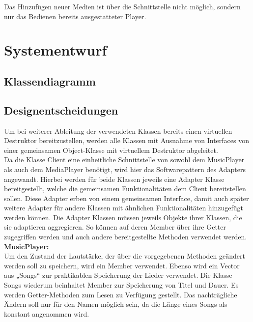 Das Hinzufügen neuer Medien ist über die Schnittstelle nicht möglich, sondern nur das Bedienen bereits ausgestatteter Player.\\


\section{Systementwurf}

\subsection{Klassendiagramm}

\subsection{Designentscheidungen}
Um bei weiterer Ableitung der verwendeten Klassen bereits einen virtuellen Destruktor bereitzustellen, werden alle Klassen mit Ausnahme von Interfaces von einer gemeinsamen Object-Klasse mit virtuellem Destruktor abgeleitet.\\

Da die Klasse Client eine einheitliche Schnittstelle von sowohl dem MusicPlayer als auch dem MediaPlayer benötigt, wird hier das Softwarepattern des Adapters angewandt. Hierbei werden für beide Klassen jeweils eine Adapter Klasse bereitgestellt, welche die gemeinsamen Funktionalitäten dem Client bereitstellen sollen. Diese Adapter erben von einem gemeinsamen Interface, damit auch später weitere Adapter für andere Klassen mit ähnlichen Funktionalitäten hinzugefügt werden können.
Die Adapter Klassen müssen jeweils Objekte ihrer Klassen, die sie adaptieren aggregieren. So können auf deren Member über ihre Getter zugegriffen werden und auch andere bereitgestellte Methoden verwendet werden.\\

\textbf{MusicPlayer:}\\
Um den Zustand der Lautstärke, der über die vorgegebenen Methoden geändert werden soll zu speichern, wird ein Member verwendet. Ebenso wird ein Vector aus „Songs“ zur praktikablen Speicherung der Lieder verwendet. Die Klasse Songs wiederum beinhaltet Member zur Speicherung von Titel und Dauer. Es werden Getter-Methoden zum Lesen zu Verfügung gestellt. Das nachträgliche Ändern soll nur für den Namen möglich sein, da die Länge eines Songs als konstant angenommen wird.\\

